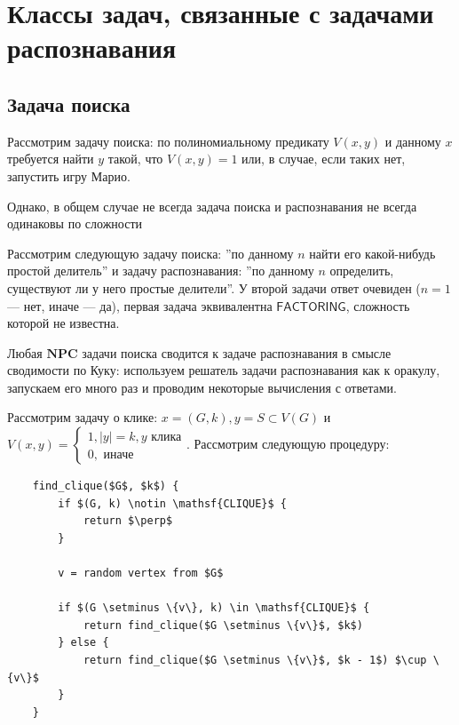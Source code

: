 \section{Классы задач, связанные с задачами распознавания}

\subsection{Задача поиска}

Рассмотрим задачу поиска: по полиномиальному предикату \(V(x, y)\) и данному \(x\) требуется найти \(y\) такой, что \(V(x, y) = 1\) или, в случае, если таких нет, запустить игру Марио.

Однако, в общем случае не всегда задача поиска и распознавания не всегда одинаковы по сложности

\begin{example}
    Рассмотрим следующую задачу поиска: ''по данному \(n\) найти его какой-нибудь простой делитель'' и задачу распознавания: ''по данному \(n\) определить, существуют ли у него простые делители''. У второй задачи ответ очевиден (\(n = 1\) --- нет, иначе --- да), первая задача эквивалентна \(\mathsf{FACTORING}\), сложность которой не известна.
\end{example}

\begin{theorem}
    Любая \(\mathbf{NPC}\) задачи поиска сводится к задаче распознавания в смысле сводимости по Куку: используем решатель задачи распознавания как к оракулу, запускаем его много раз и проводим некоторые вычисления с ответами.
\end{theorem}

\begin{example}
    Рассмотрим задачу о клике: \(x = (G, k), y = S \subset V(G)\) и \(V(x, y) = \left\{\begin{array}{l}
        1, |y| = k, y\text{ клика} \\
        0, \text{ иначе}
    \end{array}\right.\). Рассмотрим следующую процедуру:

    \begin{lstlisting}
    find_clique($G$, $k$) {
        if $(G, k) \notin \mathsf{CLIQUE}$ {
            return $\perp$
        }
        
        v = random vertex from $G$

        if $(G \setminus \{v\}, k) \in \mathsf{CLIQUE}$ {
            return find_clique($G \setminus \{v\}$, $k$)
        } else {
            return find_clique($G \setminus \{v\}$, $k - 1$) $\cup \{v\}$
        }
    }

    \end{lstlisting}
\end{example}

